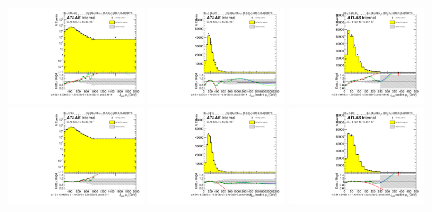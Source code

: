 \begin{figure}[htbp!]
\begin{center}
\includegraphics[width=0.32\textwidth,angle=-90]{figures/boosted/Reweight/Fits/Moriond_NoTag_3Trk_lead_Incl_sublHCand_Pt_m_1.pdf}
\includegraphics[width=0.32\textwidth,angle=-90]{figures/boosted/Reweight/Fits/Moriond_NoTag_3Trk_lead_Incl_sublHCand_trk0_Pt.pdf}
\includegraphics[width=0.32\textwidth,angle=-90]{figures/boosted/Reweight/Fits/Moriond_NoTag_3Trk_lead_Incl_sublHCand_trk1_Pt.pdf} \\
\includegraphics[width=0.32\textwidth,angle=-90]{figures/boosted/Reweight/Fits/Moriond_bkg_0_NoTag_3Trk_lead_Incl_sublHCand_Pt_m_1.pdf}
\includegraphics[width=0.32\textwidth,angle=-90]{figures/boosted/Reweight/Fits/Moriond_bkg_0_NoTag_3Trk_lead_Incl_sublHCand_trk0_Pt.pdf}
\includegraphics[width=0.32\textwidth,angle=-90]{figures/boosted/Reweight/Fits/Moriond_bkg_0_NoTag_3Trk_lead_Incl_sublHCand_trk1_Pt.pdf} \\

\end{center}
\end{figure}
